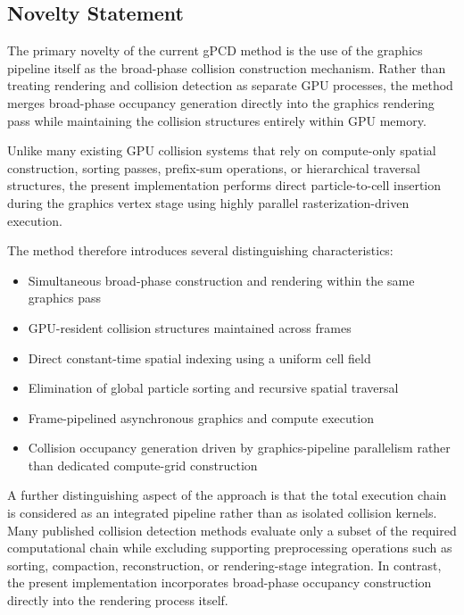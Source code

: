 \documentclass{article}
\begin{document}
\subsection{Novelty Statement}

The primary novelty of the current gPCD method is the use of the graphics pipeline itself as the broad-phase collision construction mechanism. Rather than treating rendering and collision detection as separate GPU processes, the method merges broad-phase occupancy generation directly into the graphics rendering pass while maintaining the collision structures entirely within GPU memory.

Unlike many existing GPU collision systems that rely on compute-only spatial construction, sorting passes, prefix-sum operations, or hierarchical traversal structures, the present implementation performs direct particle-to-cell insertion during the graphics vertex stage using highly parallel rasterization-driven execution.

The method therefore introduces several distinguishing characteristics:

\begin{itemize}
    \item Simultaneous broad-phase construction and rendering within the same graphics pass
    \item GPU-resident collision structures maintained across frames
    \item Direct constant-time spatial indexing using a uniform cell field
    \item Elimination of global particle sorting and recursive spatial traversal
    \item Frame-pipelined asynchronous graphics and compute execution
    \item Collision occupancy generation driven by graphics-pipeline parallelism rather than dedicated compute-grid construction
\end{itemize}

A further distinguishing aspect of the approach is that the total execution chain is considered as an integrated pipeline rather than as isolated collision kernels. Many published collision detection methods evaluate only a subset of the required computational chain while excluding supporting preprocessing operations such as sorting, compaction, reconstruction, or rendering-stage integration. In contrast, the present implementation incorporates broad-phase occupancy construction directly into the rendering process itself.
\end{document}
